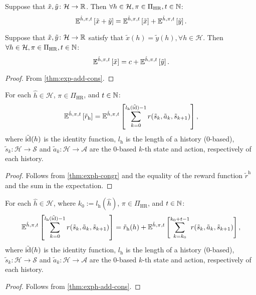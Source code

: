 \begin{theorem} \label{thm:exph-add-rv}
Suppose that $\tilde{x}, \tilde{y} \colon \mathcal{H} \to \mathbb{R} $. Then $\forall h\in \mathcal{H}, \pi\in \Pi_{\mathrm{HR}}, t \in \mathbb{N}$:
\[
  \mathbb{E}^{\hat{h}, \pi, t} \left[ \tilde{x} + \tilde{y} \right]
  =
  \mathbb{E}^{\hat{h}, \pi, t} \left[ \tilde{x} \right] + \mathbb{E}^{\hat{h}, \pi, t} \left[ \tilde{y} \right].
\]
\end{theorem}

\begin{theorem} \label{thm:exph-add-cons}
Suppose that $\tilde{x}, \tilde{y} \colon \mathcal{H} \to \mathbb{R} $ satisfy that $\tilde{x}(h) = \tilde{y}(h), \forall h \in \mathcal{H}$. Then $\forall h\in \mathcal{H}, \pi\in \Pi_{\mathrm{HR}}, t \in \mathbb{N}$:
\[
  \mathbb{E}^{\hat{h}, \pi, t} \left[ \tilde{x} \right]
  =
  c + \mathbb{E}^{\hat{h}, \pi, t} \left[ \tilde{y} \right].
\]
\end{theorem}
\begin{proof}
From \cref{thm:exp-add-cons}.
\end{proof}

\begin{theorem}\label{thm:expret-eq-sum-rew}
  For each $\hat{h}\in \mathcal{H}$, $\pi \in \Pi_{\mathrm{HR}}$, and $t\in \mathbb{N}$:
  \[
    \mathbb{E}^{\hat{h}, \pi, t} \left[ \tilde{r}_{\mathrm{h}} \right]
    =
    \mathbb{E}^{\hat{h}, \pi, t} \left[ \sum_{k=0}^{l_{\mathrm{h}}(\tilde{\operatorname{id}})-1}  r(\tilde{s}_k, \tilde{a}_k, \tilde{s}_{k+1}) \right],
  \]
  where $\tilde{\operatorname{id}}(h)$ is the identity function, $l_{\mathrm{h}}$ is the length of a history (0-based), $\tilde{s}_k\colon \mathcal{H} \to \mathcal{S}$ and $\tilde{a}_k\colon \mathcal{H} \to \mathcal{A}$ are the 0-based $k$-th state and action, respectively of each history.
  \leanok
\end{theorem}
\begin{proof}
Follows from \cref{thm:exph-congr} and the equality of the reward function $\tilde{r}^{\mathrm{h}}$ and the sum in the expectation.
\end{proof}


\begin{theorem}\label{thm:sum-rew-eq-sum-rew-rg}
  For each $\hat{h}\in \mathcal{H}$, where $k_0:=l_{\mathrm{h}}(\hat{h})$, $\pi \in \Pi_{\mathrm{HR}}$, and $t\in \mathbb{N}$:
  \[
    \mathbb{E}^{\hat{h}, \pi, t} \left[ \sum_{k=0}^{l_{\mathrm{h}}(\tilde{\operatorname{id}})-1}  r(\tilde{s}_k, \tilde{a}_k, \tilde{s}_{k+1}) \right]
    =
    \tilde{r}_{\mathrm{h}}(h) + \mathbb{E}^{\hat{h}, \pi, t} \left[ \sum_{k=k_0}^{k_0+t-1}  r(\tilde{s}_k, \tilde{a}_k, \tilde{s}_{k+1}) \right],
  \]
  where $\tilde{\operatorname{id}}(h)$ is the identity function, $l_{\mathrm{h}}$ is the length of a history (0-based), $\tilde{s}_k\colon \mathcal{H} \to \mathcal{S}$ and $\tilde{a}_k\colon \mathcal{H} \to \mathcal{A}$ are the 0-based $k$-th state and action, respectively of each history.
\end{theorem}
\begin{proof}
Follows from \cref{thm:exph-add-cons}.
\end{proof}

